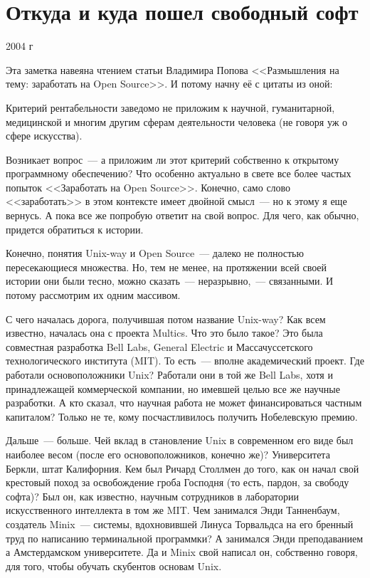 \section{Откуда и куда пошел свободный софт} 
\begin{timeline}2004 г\end{timeline}

Эта заметка навеяна чтением статьи Владимира Попова <<Размышления на тему: заработать на Open Source>>. И потому начну её с цитаты из оной:

\begin{shadequote}{}Критерий рентабельности заведомо не приложим к научной, гуманитарной, медицинской и многим другим сферам деятельности человека (не говоря уж о сфере искусства).\end{shadequote}

Возникает вопрос~--- а приложим ли этот критерий собственно к открытому программному обеспечению? Что особенно актуально в свете все более частых попыток <<Заработать на Open Source>>. Конечно, само слово <<заработать>> в этом контексте имеет двойной смысл~--- но к этому я еще вернусь. А пока все же попробую ответит на свой вопрос. Для чего, как обычно, придется обратиться к истории.

Конечно, понятия Unix-way и Open Source~--- далеко не полностью пересекающиеся множества. Но, тем не менее, на протяжении всей своей истории они были тесно, можно сказать~--- неразрывно,~--- связанными. И потому рассмотрим их одним массивом.

С чего началась дорога, получившая потом название Unix-way? Как всем известно, началась она с проекта Multics. Что это было такое? Это была совместная разработка Bell Labs, General Electric и Массачуссетского технологического института (MIT). То есть~--- вполне академический проект. Где работали основоположники Unix? Работали они в той же Bell Labs, хотя и принадлежащей коммерческой компании, но имевшей целью все же научные разработки. А кто сказал, что научная работа не может финансироваться частным капиталом? Только не те, кому посчастливилось получить Нобелевскую премию.

Дальше~--- больше. Чей вклад в становление Unix в современном его виде был наиболее весом (после его основоположников, конечно же)? Университета Беркли, штат Калифорния. Кем был Ричард Столлмен до того, как он начал свой крестовый поход за освобождение гроба Господня (то есть, пардон, за свободу софта)? Был он, как известно, научным сотрудников в лаборатории искусственного интеллекта в том же MIT. Чем занимался Энди Танненбаум, создатель Minix~--- системы, вдохновившей Линуса Торвальдса на его бренный труд по написанию терминальной программки? А занимался Энди преподаванием а Амстердамском университете. Да и Minix свой написал он, собственно говоря, для того, чтобы обучать скубентов основам Unix.

